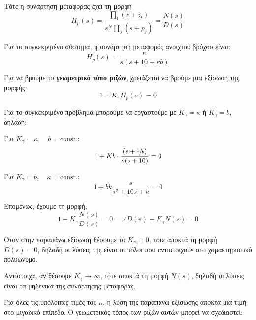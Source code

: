 \documentclass[11pt,a4paper,notitlepage,fleqn]{article}
\begin{document}
Τότε η συνάρτηση μεταφοράς έχει τη μορφή
\[
H_p(s) = \frac{\prod_{i}(s+z_i)}{s^N \prod_j (s+p_j)}
= \frac{N(s)}{D(s)}
\]

Για το συγκεκριμένο σύστημα, η συνάρτηση μεταφοράς ανοιχτού βρόχου
είναι:
\[
H_p(s) = \frac{κ}{s(s+10+κb)}
\]

Για να βρούμε το \textbf{γεωμετρικό τόπο ριζών}, χρειάζεται να
βρούμε μια εξίσωση της μορφής:
\[
\boxed{1+ K_\gamma H_p(s) = 0}
\]

Για το συγκεκριμένο πρόβλημα μπορούμε να εργαστούμε με \( K_γ = κ \)
ή \( Κ_\gamma = b \), δηλαδή:
\begin{enumgreekparen}
	\item Για \( K_γ = κ,\quad b=\mathrm{const.} \):
	\[
	1 + Kb \cdot \frac{(s+\sfrac{1}{b} )}{s(s+10)} = 0
	\]
	\item Για \( K_γ = b,\quad κ=\mathrm{const.}\):
	\[
	1 + bk \frac{s}{s^2+10s+κ} = 0
	\]
\end{enumgreekparen}


Επομένως, έχουμε τη μορφή:
\[
1+K_γ\frac{N(s)}{D(s)} = 0
\implies
D(s) + K_γN(s) = 0
\]

Όταν στην παραπάνω εξίσωση θέσουμε το \( K_γ = 0 \), τότε αποκτά
τη μορφή \( D(s) = 0\), δηλαδή οι λύσεις της είναι οι πόλοι που αντιστοιχούν
στο χαρακτηριστικό πολυώνυμο.

Αντίστοιχα, αν θέσουμε \( Κ_γ \to \infty \), τότε αποκτά τη μορφή
\( N(s) \), δηλαδή οι λύσεις είναι τα μηδενικά της συνάρτησης μεταφοράς.

Για όλες τις υπόλοιπες τιμές του \( κ \), η λύση της παραπάνω
εξίσωσης αποκτά μια τιμή στο μιγαδικό επίπεδο. Ο γεωμετρικός τόπος
των ριζών αυτών μπορεί να σχεδιαστεί:

\end{document}
